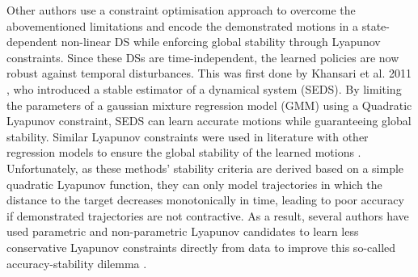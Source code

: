 Other authors use a constraint optimisation approach to overcome the abovementioned limitations and encode the demonstrated motions in a state-dependent non-linear DS while enforcing global stability through Lyapunov constraints. Since these DSs are time-independent, the learned policies are now robust against temporal disturbances. This was first done by Khansari et al. 2011 \cite{khansari-zadehLearningStableNonlinear2011}, who introduced a stable estimator of a dynamical system (SEDS). By limiting the parameters of a gaussian mixture regression model (GMM) using a Quadratic Lyapunov constraint, SEDS can learn accurate motions while guaranteeing global stability. Similar Lyapunov constraints were used in literature with other regression models to ensure the global stability of the learned motions \cite{lemmeNeurallyImprintedStable2013,huNeuralLearningStable2015,umlauftLearningStableStochastic2017,umlauftLearningStableGaussian2017,medinaLearningStableTask2017,duanFastStableLearning2019,xuRobotTrajectoryTracking2019,umlauftLearningStochasticallyStable2020,ledererGaussianProcessBasedRealTime2021,xuLearningBasedKinematicControl2022,salehiLearningDiscreteTimeUncertain2022,davoodiRuleBasedSafeProbabilistic2022}. Unfortunately, as these methods' stability criteria are derived based on a simple quadratic Lyapunov function, they can only model trajectories in which the distance to the target decreases monotonically in time, leading to poor accuracy if demonstrated trajectories are not contractive. As a result, several authors have used parametric and non-parametric Lyapunov candidates to learn less conservative Lyapunov constraints directly from data to improve this so-called accuracy-stability dilemma \cite{khansari-zadehLearningControlLyapunov2014,neumannNeuralLearningStable2013,lemmeNeuralLearningVector2014,umlauftLearningStableGaussian2017,umlauftUncertaintybasedControlLyapunov2018,duttaLearningStableMovement2018,umlauftUncertaintybasedHumanMotion2019,duttaSkillLearningHuman2021,ravanbakhshLearningControlLyapunov2019,ravanbakhshFormalPolicyLearning2019,umlauftLearningStochasticallyStable2020,xiaoLearningStableNonparametric2020,tesfazgiInverseReinforcementLearning2021,coulombeGeneratingStableCollisionFree2022}.


